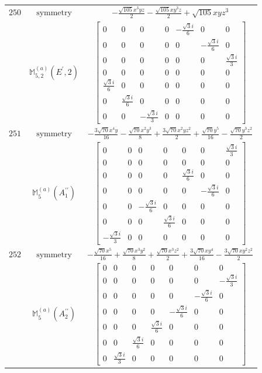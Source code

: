 \documentclass[fleqn,8pt,landscape]{jsarticle}
\begin{document}
\begin{longtable}{ccc}
$ 250 $ & $ \text{symmetry} $ & $ - \frac{\sqrt{105} x^{3} y z}{2} - \frac{\sqrt{105} x y^{3} z}{2} + \sqrt{105} x y z^{3} $ \\
$  $ & $ \mathbb{M}_{5,2}^{(a)}(E^{\prime},2) $ & $ \begin{bmatrix} 0 & 0 & 0 & 0 & - \frac{\sqrt{3} i}{6} & 0 & 0 \\ 0 & 0 & 0 & 0 & 0 & - \frac{\sqrt{3} i}{6} & 0 \\ 0 & 0 & 0 & 0 & 0 & 0 & \frac{\sqrt{3} i}{3} \\ 0 & 0 & 0 & 0 & 0 & 0 & 0 \\ \frac{\sqrt{3} i}{6} & 0 & 0 & 0 & 0 & 0 & 0 \\ 0 & \frac{\sqrt{3} i}{6} & 0 & 0 & 0 & 0 & 0 \\ 0 & 0 & - \frac{\sqrt{3} i}{3} & 0 & 0 & 0 & 0 \end{bmatrix} $ \\ \hline
$ 251 $ & $ \text{symmetry} $ & $ - \frac{3 \sqrt{70} x^{4} y}{16} - \frac{\sqrt{70} x^{2} y^{3}}{8} + \frac{3 \sqrt{70} x^{2} y z^{2}}{2} + \frac{\sqrt{70} y^{5}}{16} - \frac{\sqrt{70} y^{3} z^{2}}{2} $ \\
$  $ & $ \mathbb{M}_{5}^{(a)}(A_{1}^{\prime\prime}) $ & $ \begin{bmatrix} 0 & 0 & 0 & 0 & 0 & 0 & \frac{\sqrt{3} i}{3} \\ 0 & 0 & 0 & 0 & 0 & 0 & 0 \\ 0 & 0 & 0 & 0 & \frac{\sqrt{3} i}{6} & 0 & 0 \\ 0 & 0 & 0 & 0 & 0 & - \frac{\sqrt{3} i}{6} & 0 \\ 0 & 0 & - \frac{\sqrt{3} i}{6} & 0 & 0 & 0 & 0 \\ 0 & 0 & 0 & \frac{\sqrt{3} i}{6} & 0 & 0 & 0 \\ - \frac{\sqrt{3} i}{3} & 0 & 0 & 0 & 0 & 0 & 0 \end{bmatrix} $ \\ \hline
$ 252 $ & $ \text{symmetry} $ & $ - \frac{\sqrt{70} x^{5}}{16} + \frac{\sqrt{70} x^{3} y^{2}}{8} + \frac{\sqrt{70} x^{3} z^{2}}{2} + \frac{3 \sqrt{70} x y^{4}}{16} - \frac{3 \sqrt{70} x y^{2} z^{2}}{2} $ \\
$  $ & $ \mathbb{M}_{5}^{(a)}(A_{2}^{\prime\prime}) $ & $ \begin{bmatrix} 0 & 0 & 0 & 0 & 0 & 0 & 0 \\ 0 & 0 & 0 & 0 & 0 & 0 & - \frac{\sqrt{3} i}{3} \\ 0 & 0 & 0 & 0 & 0 & - \frac{\sqrt{3} i}{6} & 0 \\ 0 & 0 & 0 & 0 & - \frac{\sqrt{3} i}{6} & 0 & 0 \\ 0 & 0 & 0 & \frac{\sqrt{3} i}{6} & 0 & 0 & 0 \\ 0 & 0 & \frac{\sqrt{3} i}{6} & 0 & 0 & 0 & 0 \\ 0 & \frac{\sqrt{3} i}{3} & 0 & 0 & 0 & 0 & 0 \end{bmatrix} $ \\ \hline

\end{longtable}
\end{document}
